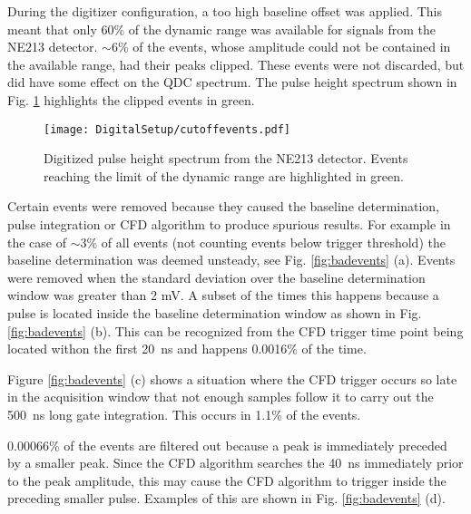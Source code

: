 \documentclass[main.tex]{subfiles}
\begin{document}
During the digitizer configuration, a too high baseline offset was applied. This meant that only 60\% of the dynamic range was available for signals from the NE213 detector. $\sim$6\% of the events, whose amplitude could not be contained in the available range, had their peaks clipped. These events were not discarded, but did have some effect on the QDC spectrum. The pulse height spectrum shown in Fig. \ref{fig:cutoffevents} highlights the clipped events in green.
\begin{figure}[hb!]
    \centering
        \texttt{[image: DigitalSetup/cutoffevents.pdf]}
        \caption[Digitized pulse height spectrum]{Digitized pulse height spectrum from the NE213 detector. Events reaching the limit of the dynamic range are highlighted in green.}
    \label{fig:cutoffevents} 
\end{figure}

Certain events were removed because they caused the baseline determination, pulse integration or CFD algorithm to produce spurious results. For example in the case of $\sim$3\% of all events (not counting events below trigger threshold) the baseline determination was deemed unsteady, see Fig. \ref{fig:badevents} (a). Events were removed when the standard deviation over the baseline determination window was greater than 2 mV. A subset of the times this happens because a pulse is located inside the baseline determination window as shown in Fig. \ref{fig:badevents} (b). This can be recognized from the CFD trigger time point being located withon the first \SI{20}{ns} and happens 0.0016\% of the time.

Figure \ref{fig:badevents} (c) shows a situation where the CFD trigger occurs so late in the acquisition window that not enough samples follow it to carry out the \SI{500}{\nano\second} long gate integration. This occurs in 1.1\% of the events.

0.00066\% of the events are filtered out because a peak is immediately  preceded by a smaller peak. Since the CFD algorithm searches the \SI{40}{ns} immediately prior to the peak amplitude, this may cause the CFD algorithm to trigger inside the preceding smaller pulse. Examples of this are shown in Fig. \ref{fig:badevents} (d).
\end{document}

